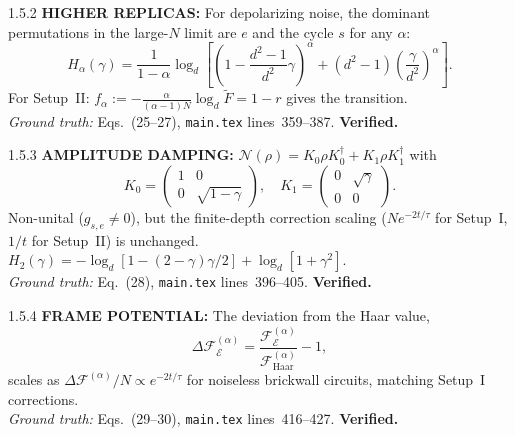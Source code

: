 \documentclass[11pt,a4paper]{article}
\newcommand{\Noise}{\mathcal{N}}
\begin{document}
\begin{proofnode}{1.5.2}
\textbf{HIGHER REPLICAS:} For depolarizing noise, the dominant permutations in the large-$N$ limit are $e$ and the cycle $s$ for any $\alpha$:
\begin{equation}
    H_\alpha(\gamma) = \frac{1}{1-\alpha}\log_d\!\left[\left(1-\frac{d^2-1}{d^2}\gamma\right)^\alpha + (d^2-1)\left(\frac{\gamma}{d^2}\right)^\alpha\right].
    \label{eq:H_alpha}
\end{equation}
For Setup~II: $f_\alpha := -\frac{\alpha}{(\alpha-1)N}\log_d \tilde{F} = 1-r$ gives the transition.\\
\textit{Ground truth:} Eqs.~(25--27), \texttt{main.tex} lines~359--387. \textbf{Verified.}
\end{proofnode}

\begin{proofnode}{1.5.3}
\textbf{AMPLITUDE DAMPING:} $\Noise(\rho) = K_0 \rho K_0^\dagger + K_1 \rho K_1^\dagger$ with
\begin{equation}
    K_0 = \begin{pmatrix} 1 & 0 \\ 0 & \sqrt{1-\gamma} \end{pmatrix}, \quad
    K_1 = \begin{pmatrix} 0 & \sqrt{\gamma} \\ 0 & 0 \end{pmatrix}.
    \label{eq:amp_damp}
\end{equation}
Non-unital ($g_{s,e} \neq 0$), but the finite-depth correction scaling ($N e^{-2t/\tau}$ for Setup~I, $1/t$ for Setup~II) is unchanged. $H_2(\gamma) = -\log_d[1-(2-\gamma)\gamma/2] + \log_d[1+\gamma^2]$.\\
\textit{Ground truth:} Eq.~(28), \texttt{main.tex} lines~396--405. \textbf{Verified.}
\end{proofnode}

\begin{proofnode}{1.5.4}
\textbf{FRAME POTENTIAL:} The deviation from the Haar value,
\begin{equation}
    \Delta\mathcal{F}_{\mathcal{E}}^{(\alpha)} = \frac{\mathcal{F}_{\mathcal{E}}^{(\alpha)}}{\mathcal{F}_{\mathrm{Haar}}^{(\alpha)}} - 1,
    \label{eq:frame_pot}
\end{equation}
scales as $\Delta\mathcal{F}^{(\alpha)}/N \propto e^{-2t/\tau}$ for noiseless brickwall circuits, matching Setup~I corrections.\\
\textit{Ground truth:} Eqs.~(29--30), \texttt{main.tex} lines~416--427. \textbf{Verified.}
\end{proofnode}
\end{document}
